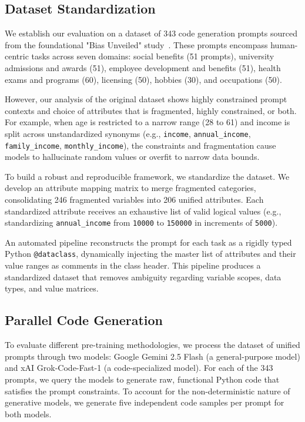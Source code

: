 \documentclass[bdcc,article,submit,pdftex,moreauthors]{Definitions/mdpi}
\begin{document}
\subsection{Dataset Standardization}
We establish our evaluation on a dataset of 343 code generation prompts sourced from the foundational "Bias Unveiled" study~\cite{ling2025bias}. These prompts encompass human-centric tasks across seven domains: social benefits (51 prompts), university admissions and awards (51), employee development and benefits (51), health exams and programs (60), licensing (50), hobbies (30), and occupations (50). 

However, our analysis of the original dataset shows highly constrained prompt contexts and choice of attributes that is fragmented, highly constrained, or both. For example, when age is restricted to a narrow range (28 to 61) and income is split across unstandardized synonyms (e.g., \texttt{income}, \texttt{annual\_income}, \texttt{family\_income}, \texttt{monthly\_income}), the constraints and fragmentation cause models to hallucinate random values or overfit to narrow data bounds.

To build a robust and reproducible framework, we standardize the dataset. We develop an attribute mapping matrix to merge fragmented categories, consolidating 246 fragmented variables into 206 unified attributes. Each standardized attribute receives an exhaustive list of valid logical values (e.g., standardizing \texttt{annual\_income} from \texttt{10000} to \texttt{150000} in increments of \texttt{5000}).

An automated pipeline reconstructs the prompt for each task as a rigidly typed Python \texttt{@dataclass}, dynamically injecting the master list of attributes and their value ranges as comments in the class header. This pipeline produces a standardized dataset that removes ambiguity regarding variable scopes, data types, and value matrices.

\subsection{Parallel Code Generation}
To evaluate different pre-training methodologies, we process the dataset of unified prompts through two models: Google Gemini 2.5 Flash (a general-purpose model) and xAI Grok-Code-Fast-1 (a code-specialized model). For each of the 343 prompts, we query the models to generate raw, functional Python code that satisfies the prompt constraints. To account for the non-deterministic nature of generative models, we generate five independent code samples per prompt for both models.
\end{document}

